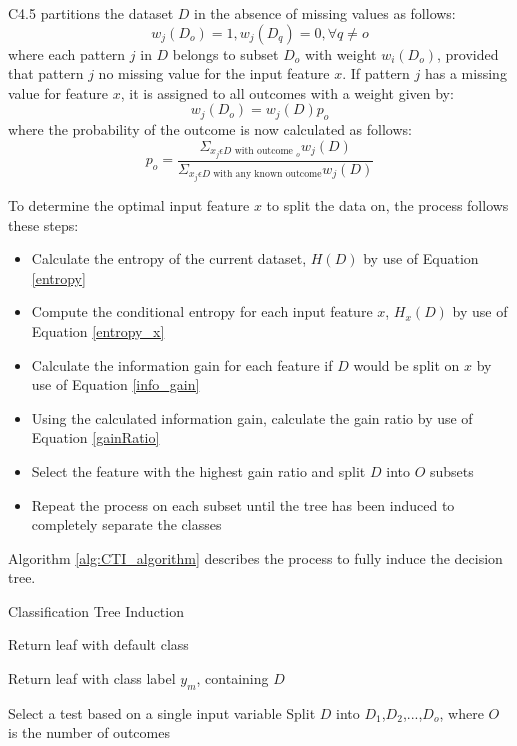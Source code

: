 \documentclass[10pt, conference]{IEEEtran}
\begin{document}
C4.5 partitions the dataset $D$ in the absence of missing values as follows: 
\begin{equation}
    w_j(D_o) = 1, w_j(D_q)=0, \forall q \neq o \label{no_missing}
\end{equation}
where each pattern $j$ in $D$ belongs to subset $D_o$ with weight $w_i(D_o)$, provided that pattern $j$ no missing value for the input
feature $x$. If pattern $j$ has a missing value for feature $x$, it is assigned to all outcomes with a weight given by:
\begin{equation}
    w_j(D_o) = w_j(D)p_o \label{with_missing}
\end{equation}
where the probability of the outcome is now calculated as follows:
\begin{equation}
    p_o = \frac{\Sigma_{x_j \epsilon D \text{ with outcome } _o} w_j(D)}{\Sigma_{x_j \epsilon D \text{ with any known outcome}} w_j(D)}
\end{equation}

To determine the optimal input feature $x$ to split the data on, the process follows these steps:
\begin{itemize}
    \item Calculate the entropy of the current dataset, $H(D)$ by use of Equation \eqref{entropy}
    \item Compute the conditional entropy for each input feature $x$, $H_x(D)$ by use of Equation \eqref{entropy_x}
    \item Calculate the information gain for each feature if $D$ would be split on $x$ by use of Equation \eqref{info_gain}
    \item Using the calculated information gain, calculate the gain ratio by use of Equation \eqref{gainRatio}
    \item Select the feature with the highest gain ratio and split $D$ into $O$ subsets
    \item Repeat the process on each subset until the tree has been induced to completely separate the classes
\end{itemize}

Algorithm \ref{alg:CTI_algorithm} describes the process to fully induce the decision tree. 
\begin{algorithm}
    \caption{Classification Tree Induction}
    \label{alg:CTI_algorithm}
    \begin{algorithmic}[1]
                \State Return leaf with default class
            \EndIf
            
                \State Return leaf with class label $y_m$, containing $D$
            \EndIf{}

            \State Select a test based on a single input variable
            \State Split $D$ into $D_1$,$D_2$,...,$D_o$, where $O$ is the number of outcomes
                \State {}
            \EndFor
        \EndFunction
    \end{algorithmic}
\end{algorithm}
\end{document}
